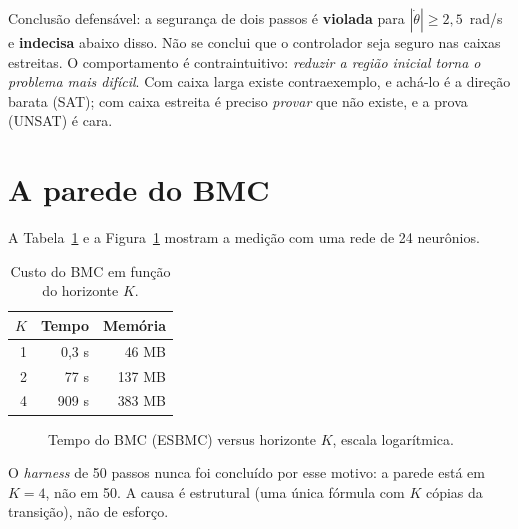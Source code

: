 \documentclass[12pt,openright,oneside,a4paper,chapter=TITLE,sumario=tradicional,english,brazil]{abntex2}
\begin{document}
Conclusão defensável: a segurança de dois passos é \textbf{violada} para $|\dot\theta|\ge2{,}5$~rad/s e \textbf{indecisa} abaixo disso. Não se conclui que o controlador seja seguro nas caixas estreitas. O comportamento é contraintuitivo: \emph{reduzir a região inicial torna o problema mais difícil}. Com caixa larga existe contraexemplo, e achá-lo é a direção barata (SAT); com caixa estreita é preciso \emph{provar} que não existe, e a prova (UNSAT) é cara.

\section{A parede do BMC}\label{sec:parede}

A Tabela~\ref{tab:parede} e a Figura~\ref{fig:parede} mostram a medição com uma rede de 24 neurônios.

\begin{table}[htb]
\caption{Custo do BMC em função do horizonte $K$.}\label{tab:parede}
\centering
\begin{tabular}{r|r|r}
\toprule
$K$ & Tempo & Memória \\
\midrule
1 & 0,3 s & 46 MB \\
2 & 77 s  & 137 MB \\
4 & 909 s & 383 MB \\
\bottomrule
\end{tabular}
\end{table}

\begin{figure}[htb]
  \caption{Tempo do BMC (ESBMC) versus horizonte $K$, escala logarítmica.}\label{fig:parede}
  \centering
\end{figure}

O \emph{harness} de 50 passos nunca foi concluído por esse motivo: a parede está em $K{=}4$, não em 50. A causa é estrutural (uma única fórmula com $K$ cópias da transição), não de esforço.
\end{document}

